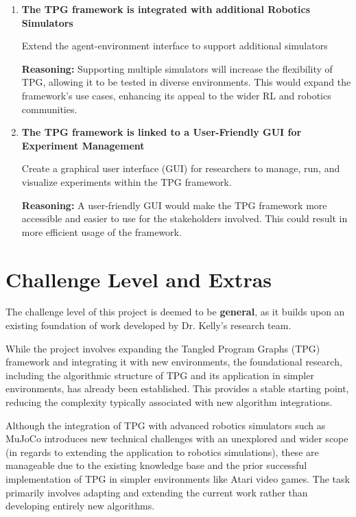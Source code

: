 \documentclass{article}
\begin{document}
    \begin{enumerate} [leftmargin=*]
        \item \textbf{The TPG framework is integrated with additional Robotics Simulators}

Extend the agent-environment interface to support additional simulators

\textbf{Reasoning:} Supporting multiple simulators will increase the flexibility of TPG, allowing it to be tested in diverse environments. This would expand the framework’s use cases, enhancing its appeal to the wider RL and robotics communities.




          \item \textbf{The TPG framework is linked to a User-Friendly GUI for Experiment Management}
          
Create a graphical user interface (GUI) for researchers to manage, run, and visualize experiments within the TPG framework.

\textbf{Reasoning:} A user-friendly GUI would make the TPG framework more accessible and easier to use for the stakeholders involved. This could result in more efficient usage of the framework.

    \end{enumerate}

\section{Challenge Level and Extras}

The challenge level of this project is deemed to be \textbf{general}, as it builds upon an existing foundation of work developed by Dr. Kelly’s research team.

While the project involves expanding the Tangled Program Graphs (TPG) framework and integrating it with new environments, the foundational research, including the algorithmic structure of TPG and its application in simpler environments, has already been established. This provides a stable starting point, reducing the complexity typically associated with new algorithm integrations.

Although the integration of TPG with advanced robotics simulators such as MuJoCo introduces new technical challenges with an unexplored and wider scope (in regards to extending the application to robotics simulations), these are manageable due to the existing knowledge base and the prior successful implementation of TPG in simpler environments like Atari video games. The task primarily involves adapting and extending the current work rather than developing entirely new algorithms.
\end{document}
